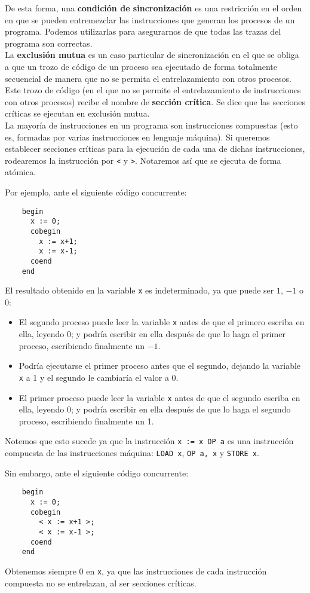 De esta forma, una \textbf{condición de sincronización} es una restricción en el orden en que se pueden entremezclar las instrucciones que generan los procesos de un programa. Podemos utilizarlas para asegurarnos de que todas las trazas del programa son correctas.\\

La \textbf{exclusión mutua} es un caso particular de sincronización en el que se obliga a que un trozo de código de un proceso sea ejecutado de forma totalmente secuencial de manera que no se permita el entrelazamiento con otros procesos. Este trozo de código (en el que no se permite el entrelazamiento de instrucciones con otros procesos) recibe el nombre de \textbf{sección crítica}. Se dice que las secciones críticas se ejecutan en exclusión mutua.\\

La mayoría de instrucciones en un programa son instrucciones compuestas (esto es, formadas por varias instrucciones en lenguaje máquina). Si queremos establecer secciones críticas para la ejecución de cada una de dichas instrucciones, rodearemos la instrucción por \verb|<| y \verb|>|.
Notaremos así que se ejecuta de forma atómica.

\begin{ejemplo}
    Por ejemplo, ante el siguiente código concurrente:
    \begin{verbatim}
    begin
      x := 0;
      cobegin
        x := x+1;
        x := x-1;
      coend
    end
    \end{verbatim}
    El resultado obtenido en la variable \verb|x| es indeterminado, ya que puede ser $1$, $-1$ o $0$:
    \begin{itemize}
        \item El segundo proceso puede leer la variable \verb|x| antes de que el primero escriba en ella, leyendo 0; y podría escribir en ella después de que lo haga el primer proceso, escribiendo finalmente un $-1$.
        \item Podría ejecutarse el primer proceso antes que el segundo, dejando la variable \verb|x| a 1 y el segundo le cambiaría el valor a 0.
        \item El primer proceso puede leer la variable \verb|x| antes de que el segundo escriba en ella, leyendo 0; y podría escribir en ella después de que lo haga el segundo proceso, escribiendo finalmente un 1.
    \end{itemize}
    Notemos que esto sucede ya que la instrucción \verb|x := x OP a| es una instrucción compuesta de las instrucciones máquina: \verb|LOAD x|, \verb|OP a, x| y \verb|STORE x|.

    Sin embargo, ante el siguiente código concurrente:
    \begin{verbatim}
    begin
      x := 0;
      cobegin
        < x := x+1 >;
        < x := x-1 >;
      coend
    end
    \end{verbatim}
    Obtenemos siempre 0 en \verb|x|, ya que las instrucciones de cada instrucción compuesta no se entrelazan, al ser secciones críticas. 
\end{ejemplo}

